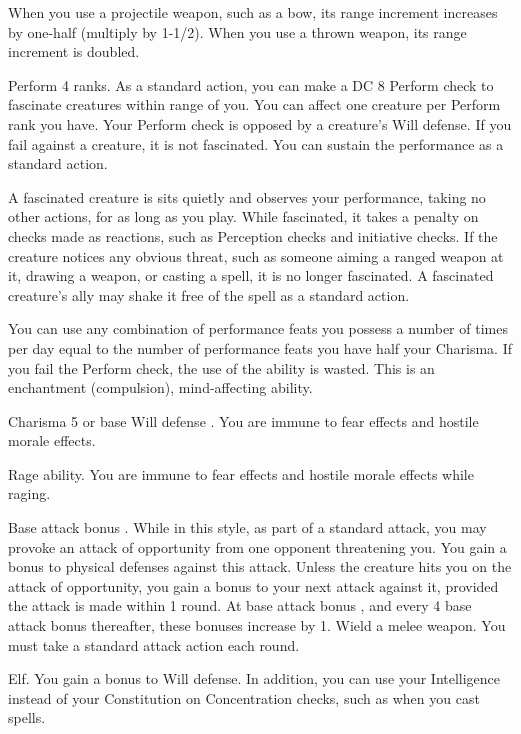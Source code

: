  When you use a projectile weapon, such as a bow, its range increment increases by one-half (multiply by 1-1/2). When you use a thrown weapon, its range increment is doubled.

\featpre Perform 4 ranks.
\featben As a standard action, you can make a DC 8 Perform check to fascinate creatures within \rngmed range of you. You can affect one creature per Perform rank you have. Your Perform check is opposed by a creature's Will defense. If you fail against a creature, it is not fascinated. You can sustain the performance as a standard action.

A fascinated creature is sits quietly and observes your performance, taking no other actions, for as long as you play. While fascinated, it takes a  penalty on checks made as reactions, such as Perception checks and initiative checks. If the creature notices any obvious threat, such as someone aiming a ranged weapon at it, drawing a weapon, or casting a spell, it is no longer fascinated. A fascinated creature's ally may shake it free of the spell as a standard action.

You can use any combination of performance feats you possess a number of times per day equal to the number of performance feats you have \add half your Charisma. If you fail the Perform check, the use of the ability is wasted. This is an enchantment (compulsion), mind-affecting ability.

\featpre Charisma 5 or base Will defense .
\featben You are immune to fear effects and hostile morale effects.

\featpre Rage ability.
\featben You are immune to fear effects and hostile morale effects while raging.

\featpre Base attack bonus .
\featben While in this style, as part of a standard attack, you may provoke an attack of opportunity from one opponent threatening you. You gain a  bonus to physical defenses against this attack. Unless the creature hits you on the attack of opportunity, you gain a  bonus to your next attack against it, provided the attack is made within 1 round. At base attack bonus , and every 4 base attack bonus thereafter, these bonuses increase by 1.
\stylereq Wield a melee weapon. You must take a standard attack action each round.

 Elf.
 You gain a  bonus to Will defense. In addition, you can use your Intelligence instead of your Constitution on Concentration checks, such as when you cast spells.

